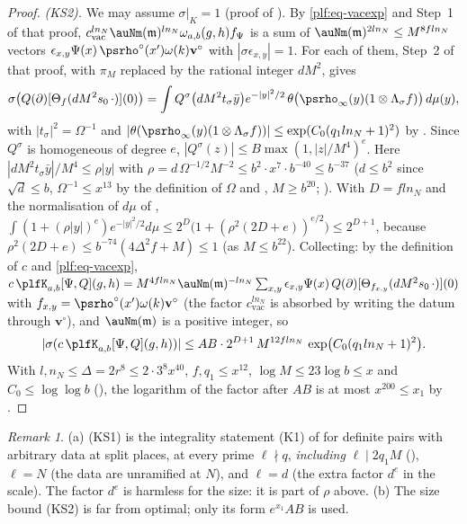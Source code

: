 \documentclass[10pt]{amsart}
\theoremstyle{definition}
\theoremstyle{remark}
\newtheorem{remark}[theorem]{Remark}
\providecommand{\psvac}{\mathbf v}
\begin{document}
\begin{proof}
\emph{(KS2).} We may assume $\sigma|_K=1$ (proof of {\cite[Proposition~14.23]{P46}}). By
\eqref{plf:eq-vacexp} and Step~1 of that proof, $c_{\mathrm{vac}}^{ln_N}\auNm(\mathfrak m)^{ln_N}
\omega_{a,b}(g,h)f_\Psi$ is a sum of $\auNm(\mathfrak m)^{2ln_N}\le M^{8fln_N}$ vectors
$\epsilon_{x,y}\Psi(x)\,\psrho^\circ(x')\omega(k)\psvac^\circ$ with $|\sigma\epsilon_{x,y}|=1$. For each
of them, Step~2 of that proof, with $\pi_M$ replaced by the rational integer $dM^2$, gives
\[
\sigma\bigl(Q(\partial)[\Theta_{f}(dM^2s_0\,\cdot)](0)\bigr)=\int Q^\sigma\bigl(dM^2t_\sigma\bar
y\bigr)e^{-|y|^2/2}\,\theta\bigl(\psrho_\infty(y)(1\otimes\Lambda_\sigma f)\bigr)\,d\mu(y),
\]
with $|t_\sigma|^2=\Omega^{-1}$ and $|\theta(\psrho_\infty(y)(1\otimes\Lambda_\sigma f))|\le
\exp(C_0(q_1ln_N+1)^2)$ by {\cite[Lemma~5.7(ii)]{P49}}. Since $Q^\sigma$ is homogeneous of degree $e$,
$|Q^\sigma(z)|\le B\max(1,|z|/M^4)^e$. Here $|dM^2t_\sigma\bar y|/M^4\le\rho|y|$ with
$\rho=d\,\Omega^{-1/2}M^{-2}\le b^2\cdot x^{7}\cdot b^{-40}\le b^{-37}$ ($d\le b^2$ since $\sqrt d\le b$, $\Omega^{-1}\le
x^{13}$ by the definition of $\Omega$ and {\cite[(38)]{P46}}, $M\ge b^{20}$; {\cite[Lemma~13.4]{P46}}).
With $D=fln_N$ and the normalisation of $d\mu$ of {\cite[\S5.1.5]{P49}},
$\int(1+(\rho|y|)^e)e^{-|y|^2/2}d\mu\le2^D\bigl(1+(\rho^2(2D+e))^{e/2}\bigr)\le2^{D+1}$, because
$\rho^2(2D+e)\le b^{-74}(4\Delta^2f+M)\le1$ (as $M\le b^{22}$). Collecting: by the definition of $c$ and
\eqref{plf:eq-vacexp}, $c\,\plfK_{a,b}[\Psi,Q](g,h)=M^{4fln_N}\auNm(\mathfrak m)^{-ln_N}\sum_{x,y}
\epsilon_{x,y}\Psi(x)\,Q(\partial)[\Theta_{f_{x,y}}(dM^2s_0\,\cdot)](0)$ with $f_{x,y}=\psrho^\circ(x')
\omega(k)\psvac^\circ$ (the factor $c_{\mathrm{vac}}^{ln_N}$ is absorbed by writing the datum through
$\psvac^\circ$), and $\auNm(\mathfrak m)$ is a positive integer, so
\[
|\sigma(c\,\plfK_{a,b}[\Psi,Q](g,h))|\le AB\cdot2^{D+1}\,M^{12fln_N}\,
\exp\bigl(C_0(q_1ln_N+1)^2\bigr).
\]
With $l,n_N\le\Delta=2r^8\le2\cdot3^8x^{40}$, $f,q_1\le x^{12}$, $\log M\le23\log b\le x$ and
$C_0\le\log\log b$ ({\cite[Lemma~8.7]{P49}}), the logarithm of the factor after $AB$ is
at most $x^{200}\le x_1$ by {\cite[(36)]{P46}}.
\end{proof}

\begin{remark}\label{plf:rem-KS}
(a) (KS1) is the integrality statement (K1) of {\cite[Lemma~4.13]{P49}} for definite pairs with
arbitrary data at split places, at every prime $\ell\nmid q$, \emph{including} $\ell\mid2q_1M$
({\cite[Theorem~7.15]{P49}}), $\ell=N$ (the data are unramified at $N$), and $\ell=d$ (the extra factor
$d^e$ in the scale). The factor $d^e$ is harmless for the size: it is part of $\rho$ above.
(b) The size bound (KS2) is far from optimal; only its form $e^{x_1}AB$ is used.
\end{remark}
\end{document}
